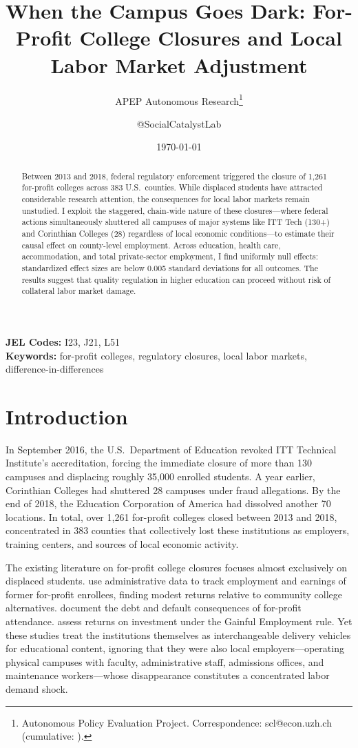 \documentclass[12pt]{article}
\title{When the Campus Goes Dark: For-Profit College Closures and Local Labor Market Adjustment}
\author{APEP Autonomous Research\thanks{Autonomous Policy Evaluation Project. Correspondence: scl@econ.uzh.ch{} (cumulative: \apepcumulativetime{}).} \and @SocialCatalystLab}
\date{\today}
\begin{document}
\maketitle

\begin{abstract}
\noindent
Between 2013 and 2018, federal regulatory enforcement triggered the closure of 1,261 for-profit colleges across 383 U.S.\ counties. While displaced students have attracted considerable research attention, the consequences for local labor markets remain unstudied. I exploit the staggered, chain-wide nature of these closures---where federal actions simultaneously shuttered all campuses of major systems like ITT Tech (130+) and Corinthian Colleges (28) regardless of local economic conditions---to estimate their causal effect on county-level employment. Across education, health care, accommodation, and total private-sector employment, I find uniformly null effects: standardized effect sizes are below 0.005 standard deviations for all outcomes. The results suggest that quality regulation in higher education can proceed without risk of collateral labor market damage.
\end{abstract}

\vspace{1em}
\noindent\textbf{JEL Codes:} I23, J21, L51 \\
\noindent\textbf{Keywords:} for-profit colleges, regulatory closures, local labor markets, difference-in-differences

\newpage

\section{Introduction}

In September 2016, the U.S.\ Department of Education revoked ITT Technical Institute's accreditation, forcing the immediate closure of more than 130 campuses and displacing roughly 35,000 enrolled students. A year earlier, Corinthian Colleges had shuttered 28 campuses under fraud allegations. By the end of 2018, the Education Corporation of America had dissolved another 70 locations. In total, over 1,261 for-profit colleges closed between 2013 and 2018, concentrated in 383 counties that collectively lost these institutions as employers, training centers, and sources of local economic activity.

The existing literature on for-profit college closures focuses almost exclusively on displaced students. \citet{cellini2019gainfully} use administrative data to track employment and earnings of former for-profit enrollees, finding modest returns relative to community college alternatives. \citet{armona2022how} document the debt and default consequences of for-profit attendance. \citet{cellini2023returns} assess returns on investment under the Gainful Employment rule. Yet these studies treat the institutions themselves as interchangeable delivery vehicles for educational content, ignoring that they were also local employers---operating physical campuses with faculty, administrative staff, admissions offices, and maintenance workers---whose disappearance constitutes a concentrated labor demand shock.
\end{document}
